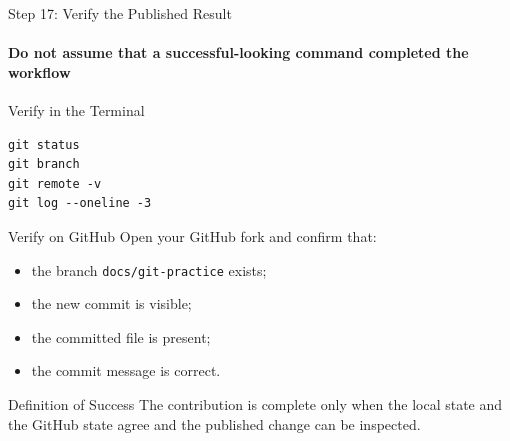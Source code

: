 \begin{frame}[fragile]{Step 17: Verify the Published Result}
\framesubtitle{Do not assume that a successful-looking command completed the workflow}

\footnotesize

\begin{block}{Verify in the Terminal}
\begin{verbatim}
git status
git branch
git remote -v
git log --oneline -3
\end{verbatim}
\end{block}

\begin{exampleblock}{Verify on GitHub}
Open your GitHub fork and confirm that:

\begin{itemize}
    \setlength{\itemsep}{0.18em}
    \item the branch \texttt{docs/git-practice} exists;
    \item the new commit is visible;
    \item the committed file is present;
    \item the commit message is correct.
\end{itemize}
\end{exampleblock}

\begin{alertblock}{Definition of Success}
The contribution is complete only when the local state and the GitHub
state agree and the published change can be inspected.
\end{alertblock}

\end{frame}

